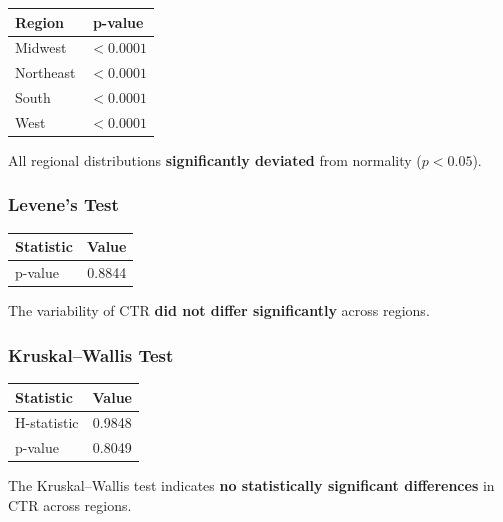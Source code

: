 \begin{table}[H]
	\centering
	\begin{tabular}{lc}
		\toprule
		Region & p-value \\
		\midrule
		Midwest & $<0.0001$ \\
		Northeast & $<0.0001$ \\
		South & $<0.0001$ \\
		West & $<0.0001$ \\
		\bottomrule
	\end{tabular}
\end{table}

All regional distributions \textbf{significantly deviated} from normality ($p<0.05$).

\vspace{0.3cm}

\subsubsection{Levene's Test}

\begin{table}[H]
	\centering
	\begin{tabular}{lc}
		\toprule
		Statistic & Value \\
		\midrule
		p-value & 0.8844 \\
		\bottomrule
	\end{tabular}
\end{table}

The variability of CTR \textbf{did not differ significantly} across regions.

\vspace{0.3cm}

\subsubsection{Kruskal--Wallis Test}

\begin{table}[H]
	\centering
	\begin{tabular}{lc}
		\toprule
		Statistic & Value \\
		\midrule
		H-statistic & 0.9848 \\
		p-value & 0.8049 \\
		\bottomrule
	\end{tabular}
\end{table}

The Kruskal--Wallis test indicates \textbf{no statistically significant differences} in CTR across regions.

